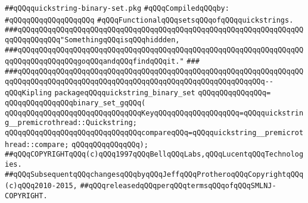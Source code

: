 \label{src/lib/src/quickstring-binary-set.pkg}
\verb|##qQQqquickstring-binary-set.pkg|\newline
\newline
\verb|#qQQqCompiledqQQqby:|\newline
\verb|#qQQqqQQqqQQqqQQqqQQq|\newline
\newline
\verb|#qQQqFunctionalqQQqsetsqQQqofqQQqquickstrings.|\newline
\newline
\newline
\newline
\verb|###qQQqqQQqqQQqqQQqqQQqqQQqqQQqqQQqqQQqqQQqqQQqqQQqqQQqqQQqqQQqqQQqqQQqqQQqqQQqqQQq"SomethingqQQqisqQQqhiddden,|\newline
\verb|###qQQqqQQqqQQqqQQqqQQqqQQqqQQqqQQqqQQqqQQqqQQqqQQqqQQqqQQqqQQqqQQqqQQqqQQqqQQqqQQqqQQqgoqQQqandqQQqfindqQQqit."|\newline
\verb|###|\newline
\verb|###qQQqqQQqqQQqqQQqqQQqqQQqqQQqqQQqqQQqqQQqqQQqqQQqqQQqqQQqqQQqqQQqqQQqqQQqqQQqqQQqqQQqqQQqqQQqqQQqqQQqqQQqqQQqqQQqqQQqqQQqqQQqqQQq--qQQqKipling|\newline
\newline
\newline
\newline
\verb|packageqQQqquickstring_binary_set|\newline
\verb|qQQqqQQqqQQqqQQq=|\newline
\verb|qQQqqQQqqQQqqQQqbinary_set_gqQQq(|\newline
\verb|qQQqqQQqqQQqqQQqqQQqqQQqqQQqqQQqKeyqQQqqQQqqQQqqQQqqQQq=qQQqquickstring__premicrothread::Quickstring;|\newline
\verb|qQQqqQQqqQQqqQQqqQQqqQQqqQQqqQQqcompareqQQq=qQQqquickstring__premicrothread::compare;|\newline
\verb|qQQqqQQqqQQqqQQq);|\newline
\newline
\newline
\verb|##qQQqCOPYRIGHTqQQq(c)qQQq1997qQQqBellqQQqLabs,qQQqLucentqQQqTechnologies.|\newline
\verb|##qQQqSubsequentqQQqchangesqQQqbyqQQqJeffqQQqProtheroqQQqCopyrightqQQq(c)qQQq2010-2015,|\newline
\verb|##qQQqreleasedqQQqperqQQqtermsqQQqofqQQqSMLNJ-COPYRIGHT.|\newline

